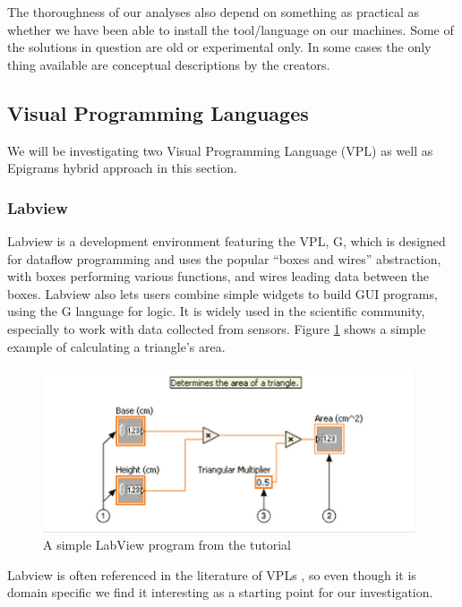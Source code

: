 The thoroughness of our analyses also depend on something as practical as whether we have been able to install the tool/language on our machines. Some of the solutions in question are old or experimental only. In some cases the only thing available are conceptual descriptions by the
creators.

\subsection{Visual Programming Languages}
We will be investigating two Visual Programming Language (VPL) as well as Epigrams hybrid approach in this section.


\subsubsection{Labview}
\label{subsub:Labview}
Labview is a development environment featuring the VPL, G, which is designed for dataflow programming and uses the popular ``boxes and wires'' abstraction, with boxes performing various functions, and wires leading data between the boxes. Labview also lets users combine simple widgets to build GUI programs, using the G language for logic. It is widely used in the scientific community, especially to work with data collected from sensors.
Figure \ref{fig:LabViewGettingStarted} shows a simple example of calculating a
triangle's area.

\begin{figure}
	\centering
		\includegraphics[width=110mm]{diagrams/LabView_screenshot.png}
	\caption{A simple LabView program from the tutorial\,\cite{LabView:GettingStarted}}
\label{fig:LabViewGettingStarted}
\end{figure}

Labview is often referenced in the literature of VPLs , so even though it is domain specific we find it interesting as a starting point for our investigation.

